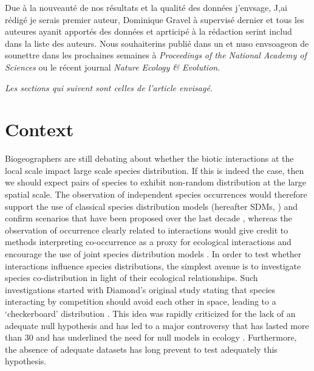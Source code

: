 Due à la nouveauté de nos résultats et la qualité des données j'envsage, J,ai rédigé je serais premier auteur, Dominique Gravel à supervisé dernier et tous les auteures ayanit apportés des données et aprticipé à la rédaction serint includ dans la liste des auteurs. Nous souhaiterins publié dans un et nuso envsoageon de sounettre dans les prochaines semaines à \emph{Proceedings of the National Academy of Sciences} ou le récent journal \emph{Nature Ecology \& Evolution}.



\emph{Les sections qui suivent sont celles de l'article envisagé.}


\newpage
\section{Context}\label{context}

Biogeographers are still debating about whether the biotic interactions
at the local scale impact large scale species distribution. If this is
indeed the case, then we should expect pairs of species to exhibit
non-random distribution at the large spatial scale. The observation of
independent species occurrences would therefore support the use of
classical species distribution models (hereafter SDMs,
\citet{Elith2006}) and confirm scenarios that have been proposed over
the last decade \citep{Thuiller2005, Thuiller2011, Albouy2012}, whereas
the observation of occurrence clearly related to interactions would give
credit to methods interpreting co-occurrence as a proxy for ecological
interactions \citep{Morales-Castilla2015} and encourage the use of joint
species distribution models \citep[hereafter
JSDM,][]{Ovaskainen2010, Pollock2014}. In order to test whether
interactions influence species distributions, the simplest avenue is to
investigate species co-distribution in light of their ecological
relationships. Such investigations started with Diamond's original study
stating that species interacting by competition should avoid each other
in space, leading to a `checkerboard' distribution \citep{Diamond1975}.
This idea was rapidly criticized for the lack of an adequate null
hypothesis \citep{Connor1979, Gilpin1982} and has led to a major
controversy that has lasted more than 30 \citep{Connor2013} and has
underlined the need for null models in ecology
\citep{Connor1983, Gotelli2000}. Furthermore, the absence of adequate
datasets has long prevent to test adequately this hypothesis.

